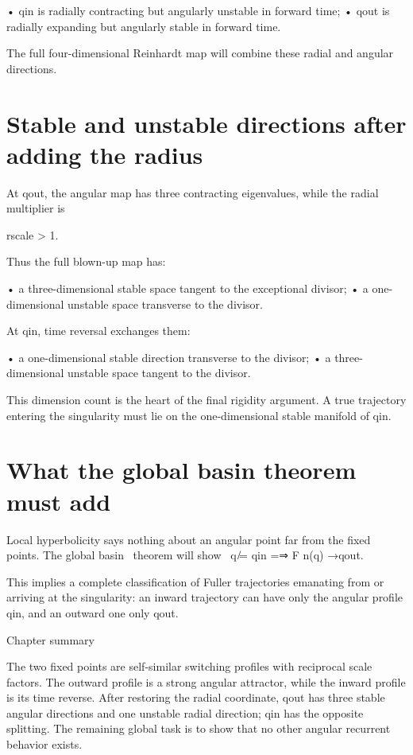 • qin is radially contracting but angularly unstable in forward time; • qout is radially expanding but angularly stable in forward time.


The full four-dimensional Reinhardt map will combine these radial and angular directions.


\section{Stable and unstable directions after adding the radius}

At qout, the angular map has three contracting eigenvalues, while the radial multiplier is


rscale > 1.


Thus the full blown-up map has:


• a three-dimensional stable space tangent to the exceptional divisor; • a one-dimensional unstable space transverse to the divisor.


At qin, time reversal exchanges them:


• a one-dimensional stable direction transverse to the divisor; • a three-dimensional unstable space tangent to the divisor.


This dimension count is the heart of the final rigidity argument. A true trajectory entering the singularity must lie on the one-dimensional stable manifold of qin.


\section{What the global basin theorem must add}

\begin{displaytext}
Local hyperbolicity says nothing about an angular point far from the fixed points. The global basin \
theorem will show \
q ̸= qin =⇒ F n(q) →qout.
\end{displaytext}

This implies a complete classification of Fuller trajectories emanating from or arriving at the singularity: an inward trajectory can have only the angular profile qin, and an outward one only qout.


\begin{insightbox}{Chapter summary}
\end{insightbox}

The two fixed points are self-similar switching profiles with reciprocal scale factors. The outward profile is a strong angular attractor, while the inward profile is its time reverse. After restoring the radial coordinate, qout has three stable angular directions and one unstable radial direction; qin has the opposite splitting. The remaining global task is to show that no other angular recurrent behavior exists.


